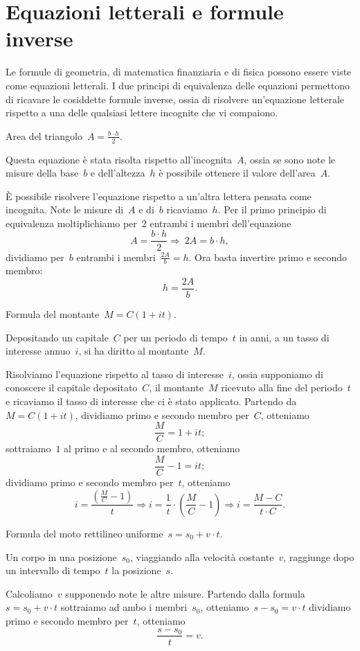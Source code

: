 \section{Equazioni letterali e formule inverse}
\label{sec:compl1_formuleinverse}

Le formule di geometria, di matematica finanziaria e di fisica possono essere 
viste come equazioni letterali.
I due principi di equivalenza delle equazioni permettono di ricavare le 
cosiddette formule inverse, ossia di risolvere
un'equazione letterale rispetto a una delle qualsiasi lettere incognite che vi 
compaiono.

 \begin{esempio}
Area del triangolo~\(A=\frac{b\cdot h}{2}\).

Questa equazione è stata risolta rispetto all'incognita~\(A\), ossia se sono 
note le misure della base~\(b\) e dell'altezza~\(h\)
è possibile ottenere il valore dell'area~\(A\).

È possibile risolvere l'equazione rispetto a un'altra lettera pensata come 
incognita.
Note le misure di~\(A\) e di~\(b\) ricaviamo~\(h\). Per il primo principio di 
equivalenza moltiplichiamo per~\(2\)
entrambi i membri dell'equazione
\[A=\frac{b\cdot h}{2}\Rightarrow~2A=b\cdot h,\]
dividiamo per~\(b\) entrambi i membri~\(\frac{2A}{b}=h\).
Ora basta invertire primo e secondo membro: \[h=\frac{2A}{b}.\]
 \end{esempio}

 \begin{esempio}
Formula del montante~\(M=C(1+it)\).

Depositando un capitale~\(C\) per un periodo di tempo~\(t\) in anni, a un tasso di 
interesse annuo~\(i\),
si ha diritto al montante~\(M\).

Risolviamo l'equazione rispetto al tasso di interesse~\(i\), ossia supponiamo di 
conoscere il capitale depositato~\(C\), il montante~\(M\)
ricevuto alla fine del periodo~\(t\) e ricaviamo il tasso di interesse che ci è 
stato applicato.
Partendo da~\(M=C(1+it)\), dividiamo primo e secondo membro per~\(C\), otteniamo 
\[\frac{M}{C}=1+it;\]
sottraiamo~\(1\) al primo e al secondo membro, otteniamo
\[\frac{M}{C}-1=it;\] dividiamo primo e secondo membro per~\(t\),
otteniamo
\[i=\frac{\left(\frac{M}{C}-1\right)}{t}\Rightarrow%
i=\frac{1}{t}\cdot \left(\frac{M}{C}-1\right)\Rightarrow 
i=\frac{M-C}{t\cdot C}.\]
 \end{esempio}

 \begin{esempio}
Formula del moto rettilineo uniforme~\(s=s_{0}+v\cdot t\).

Un corpo in una posizione~\(s_0\), viaggiando alla velocità costante~\(v\), 
raggiunge dopo un intervallo di tempo~\(t\) la posizione~\(s\).

Calcoliamo~\(v\) supponendo note le altre misure.
Partendo dalla formula~\(s=s_{0}+v\cdot t\) 
sottraiamo ad ambo i membri~\(s_0\), 
otteniamo~\(s-s_{0}=v\cdot t\)
dividiamo primo e secondo membro per~\(t\), otteniamo 
\[\frac{s-s_{0}}{t}=v.\]
 \end{esempio}

